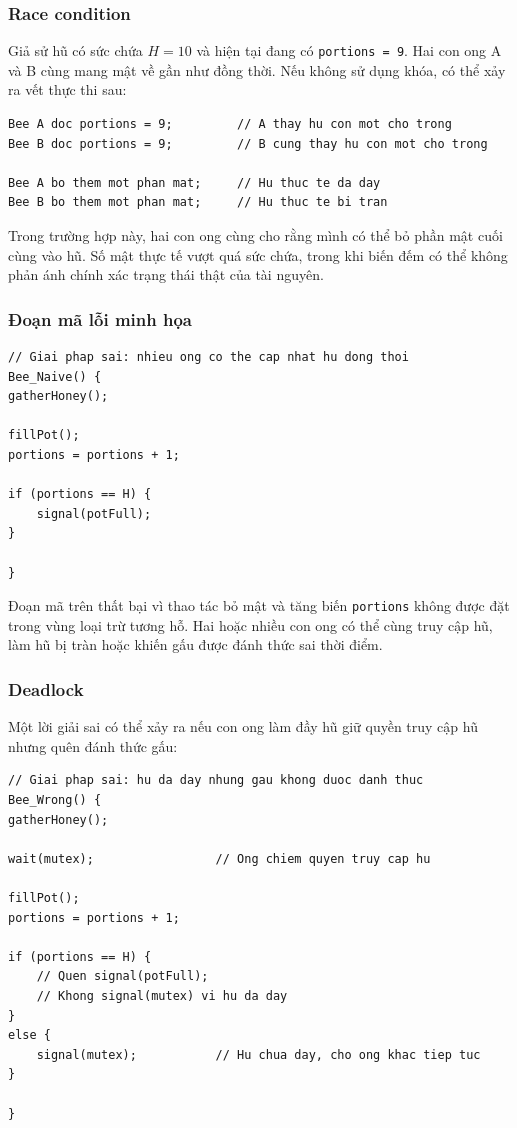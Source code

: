 \subsubsection*{Race condition}

Giả sử hũ có sức chứa $H = 10$ và hiện tại đang có
\texttt{portions = 9}. Hai con ong A và B cùng mang mật về gần như
đồng thời. Nếu không sử dụng khóa, có thể xảy ra vết thực thi sau:

\begin{lstlisting}
Bee A doc portions = 9;         // A thay hu con mot cho trong
Bee B doc portions = 9;         // B cung thay hu con mot cho trong

Bee A bo them mot phan mat;     // Hu thuc te da day
Bee B bo them mot phan mat;     // Hu thuc te bi tran
\end{lstlisting}

Trong trường hợp này, hai con ong cùng cho rằng mình có thể bỏ phần mật
cuối cùng vào hũ. Số mật thực tế vượt quá sức chứa, trong khi biến đếm
có thể không phản ánh chính xác trạng thái thật của tài nguyên.

\subsubsection*{Đoạn mã lỗi minh họa}

\begin{lstlisting}
// Giai phap sai: nhieu ong co the cap nhat hu dong thoi
Bee_Naive() {
gatherHoney();

fillPot();
portions = portions + 1;

if (portions == H) {
    signal(potFull);
}

}
\end{lstlisting}

Đoạn mã trên thất bại vì thao tác bỏ mật và tăng biến
\texttt{portions} không được đặt trong vùng loại trừ tương hỗ. Hai hoặc
nhiều con ong có thể cùng truy cập hũ, làm hũ bị tràn hoặc khiến gấu
được đánh thức sai thời điểm.

\subsubsection*{Deadlock}

Một lời giải sai có thể xảy ra nếu con ong làm đầy hũ giữ quyền truy cập
hũ nhưng quên đánh thức gấu:

\begin{lstlisting}
// Giai phap sai: hu da day nhung gau khong duoc danh thuc
Bee_Wrong() {
gatherHoney();

wait(mutex);                 // Ong chiem quyen truy cap hu

fillPot();
portions = portions + 1;

if (portions == H) {
    // Quen signal(potFull);
    // Khong signal(mutex) vi hu da day
}
else {
    signal(mutex);           // Hu chua day, cho ong khac tiep tuc
}

}
\end{lstlisting}

